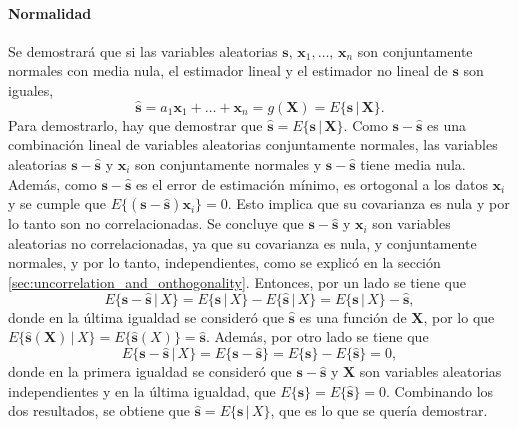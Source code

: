 \documentclass[a4paper]{report}
\newcommand{\X}{\mathbf{X}}
\newcommand{\x}{\mathbf{x}}
\newcommand{\s}{\mathbf{s}}
\begin{document}
\paragraph{Normalidad} Se demostrará que si las variables aleatorias \(\s,\,\x_1,\dots,\,\x_n\) son conjuntamente normales con media nula, el estimador lineal y el estimador no lineal de \(\s\) son iguales,
\begin{equation}\label{eq:mse_normal_rv}
  \hat{\s}=a_1\x_1+\dots+\x_n=g(\X)=E\{\s\,|\,\X\}.
\end{equation}
Para demostrarlo, hay que demostrar que \(\hat{\s}=E\{\s\,|\,\X\}\). Como \(\s-\hat{\s}\) es una combinación lineal de variables aleatorias conjuntamente normales, las variables aleatorias \(\s-\hat{\s}\) y \(\x_i\) son conjuntamente normales y \(\s-\hat{\s}\) tiene media nula. Además, como  \(\s-\hat{\s}\) es el error de estimación mínimo, es ortogonal a los datos \(\x_i\) y se cumple que \(E\{(\s-\hat{\s})\x_i\}=0\). Esto implica que su covarianza es nula y por lo tanto son no correlacionadas. Se concluye que  \(\s-\hat{\s}\) y \(\x_i\) son variables aleatorias no correlacionadas, ya que su covarianza es nula, y conjuntamente normales, y por lo tanto, independientes, como se explicó en la sección \ref{sec:uncorrelation_and_onthogonality}. Entonces, por un lado se tiene que
\[
 E\{\s-\hat{\s}\,|\,X\}=E\{\s\,|\,X\}-E\{\hat{\s}\,|\,X\}=E\{\s\,|\,X\}-\hat{\s},
\]
donde en la última igualdad se consideró que \(\hat{\s}\) es una función de \(\X\), por lo que \(E\{\hat{\s}(\X)\,|\,X\}=E\{\hat{\s}(X)\}=\hat{\s}\). Además, por otro lado se tiene que
\[
 E\{\s-\hat{\s}\,|\,X\}=E\{\s-\hat{\s}\}=E\{\s\}-E\{\hat{\s}\}=0,
\]
donde en la primera igualdad se consideró que \(\s-\hat{\s}\) y \(\X\) son variables aleatorias independientes y en la última igualdad, que \(E\{\s\}=E\{\hat{\s}\}=0\). Combinando los dos resultados, se obtiene que \(\hat{\s}=E\{\s\,|\,X\}\), que es lo que se quería demostrar.
\end{document}
